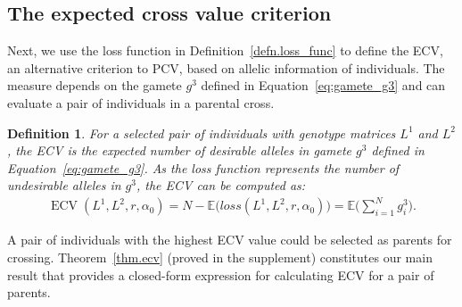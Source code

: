 \documentclass[12pt, a4paper, bibliography=totoc]{scrartcl}
\newtheorem{proposition}{Proposition}
\newtheorem{definition}{Definition}
\DeclareMathOperator*{\ECV}{ECV}
\begin{document}


\subsection*{The expected cross value criterion}\label{subsec:ecv}
Next, we use the loss function in Definition~\ref{defn.loss_func} to define the ECV, an alternative criterion to PCV, based on allelic information of individuals. The measure depends on the gamete $g^3$ defined in Equation~\eqref{eq:gamete_g3} and can evaluate a pair of individuals in a parental cross.
\begin{definition} \label{defn.ecv}
For a selected pair of individuals with genotype matrices $L^{1}$ and $L^{2}$, the ECV is the expected number of desirable alleles in gamete $g^3$ defined in Equation~\eqref{eq:gamete_g3}. As the loss function represents the number of undesirable alleles in $g^3$, the ECV can be computed as:
\begin{align} \label{eq:ecv_with_loss_func}
    \ECV(L^1,L^2,r,\alpha_0)= N - \mathbb{E}\big(loss(L^1,L^2,r,\alpha_0)\big) = \mathbb{E}\bigg(\sum_{i=1}^{N}g_i^{3}\bigg).
\end{align}
\end{definition}
A pair of individuals with the highest ECV value could be selected as parents for crossing. Theorem~\ref{thm.ecv} (proved in the supplement)  constitutes our main result that provides a closed-form expression for calculating ECV for a pair of parents.
\end{document}

